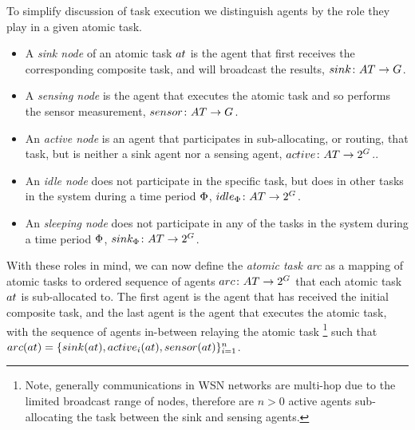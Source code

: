 To simplify discussion of task execution we distinguish agents by the role they play in a given atomic task.
\begin{itemize}
	\item A \textit{sink node} of an atomic task $\varAtomicTask{}{}$ is the agent that first receives the corresponding composite task, and will broadcast the results, $\formalSinkRole{}{}$.
	\item A \textit{sensing node} is the agent that executes the atomic task and so performs the sensor measurement, $\formalSenseRole{}{}$.
	\item An \textit{active node} is an agent that participates in sub-allocating, or routing, that task, but is neither a sink agent nor a sensing agent, $\formalActiveRole{}{}$..
	\item An \textit{idle node} does not participate in the specific task, but does in other tasks in the system during a time period $\Phi$, $\formalIdleRole{}{}$.
	\item An \textit{sleeping node} does not participate in any of the tasks in the system during a time period $\Phi$, $\formalSleepRole{}{}$.
\end{itemize}
With these roles in mind, we can now define the  \textit{atomic task arc} as a mapping of atomic tasks to ordered sequence of agents $\formalTaskArc{}{}$ that each atomic task $\varAtomicTask{}{}$ is sub-allocated to. The first agent is the agent that has received the initial composite task, and the last agent is the agent that executes the atomic task, with the sequence of agents in-between relaying the atomic task \footnote{Note, generally communications in WSN networks are multi-hop due to the limited broadcast range of nodes, therefore are $n>0$ active agents sub-allocating the task between the sink and sensing agents.} such that 
$\functionTaskArc{}{} = \lbrace \functionSinkRole{}{}, \functionActiveRole{i}{}, \functionSenseRole{}{} \rbrace_{i=1}^{n}$. 
